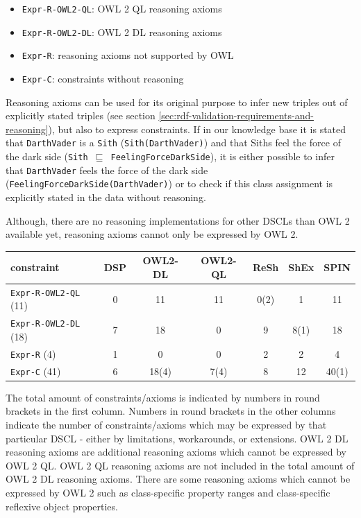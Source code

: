 \documentclass{llncs}
\newcommand{\ms}[1]{\texttt{#1}}
\newcommand{\tb}[1]{\todo[size=\small, color=green!40]{\textbf{Thomas:} #1}}
\newenvironment{evaluation}{
  \scriptsize
  \sffamily
  \vspace{0.3cm}
  \begin{tabular}{l|c|c|c|c|c|c}
  \hline
  \textbf{constraint} & \textbf{DSP} & \textbf{OWL2-DL} & \textbf{OWL2-QL} & \textbf{ReSh} & \textbf{ShEx} & \textbf{SPIN} \\
  \hline

}{
  \hline
  \end{tabular}
  \linebreak
}
\begin{document}
\begin{itemize}
	\item \ms{Expr-R-OWL2-QL}: OWL 2 QL reasoning axioms
	\item \ms{Expr-R-OWL2-DL}: OWL 2 DL reasoning axioms
	\item \ms{Expr-R}: reasoning axioms not supported by OWL
	\item \ms{Expr-C}: constraints without reasoning
\end{itemize}

Reasoning axioms can be used for its original purpose to infer new triples out of explicitly stated triples (see section \ref{sec:rdf-validation-requirements-and-reasoning}), but also to express constraints.
If in our knowledge base it is stated that \ms{DarthVader} is a \ms{Sith} (\ms{Sith(DarthVader)}) and that Siths feel the force of the dark side (\ms{Sith $\sqsubseteq$ FeelingForceDarkSide}), it is either possible to infer that \ms{DarthVader} feels the force of the dark side (\ms{FeelingForceDarkSide(DarthVader)}) 
or to check if this class assignment is explicitly stated in the data without reasoning.  

Although, there are no reasoning implementations for other DSCLs than OWL 2 available yet, 
reasoning axioms cannot only be expressed by OWL 2.

\begin{evaluation}
\ms{Expr-R-OWL2-QL} (11) & 0 & 11 & 11 & 0(2) & 1 & 11 \\
\ms{Expr-R-OWL2-DL} (18) & 7 & 18 & 0 & 9 & 8(1) & 18 \\
\ms{Expr-R} (4) & 1 & 0 & 0 & 2 & 2 & 4 \\ 
\ms{Expr-C} (41) & 6 & 18(4) & 7(4) & 8 & 12 & 40(1)\\
\end{evaluation}

\tb{ToDo Thomas: refer to table}

The total amount of constraints/axioms is indicated by numbers in round brackets in the first column.
Numbers in round brackets in the other columns indicate the number of constraints/axioms which may be expressed by that particular DSCL - either by limitations, workarounds, or extensions.  
OWL 2 DL reasoning axioms are additional reasoning axioms which cannot be expressed by OWL 2 QL. 
OWL 2 QL reasoning axioms are not included in the total amount of OWL 2 DL reasoning axioms.
There are some reasoning axioms which cannot be expressed by OWL 2 such as class-specific property ranges and class-specific reflexive object properties.
\end{document}
